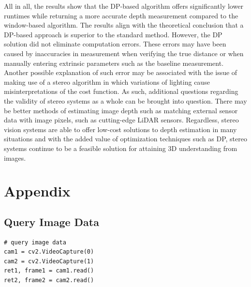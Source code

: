 \documentclass[11pt]{scrartcl}
\begin{document}
All in all, the results show that the DP-based algorithm offers significantly lower runtimes while returning a more accurate depth measurement compared to the window-based algorithm. The results align with the theoretical conclusion that a DP-based approach is superior to the standard method. However, the DP solution did not eliminate computation errors. These errors may have been caused by inaccuracies in measurement when verifying the true distance or when manually entering extrinsic parameters such as the baseline measurement. Another possible explanation of such error may be associated with the issue of making use of a stereo algorithm in which variations of lighting cause misinterpretations of the cost function. As such, additional questions regarding the validity of stereo systems as a whole can be brought into question. There may be better methods of estimating image depth such as matching external sensor data with image pixels, such as cutting-edge LiDAR sensors. Regardless, stereo vision systems are able to offer low-cost solutions to depth estimation in many situations and with the added value of optimization techniques such as DP, stereo systems continue to be a feasible solution for attaining 3D understanding from images.  



\section{Appendix}

\subsection{Query Image Data}
\begin{verbatim}
# query image data
cam1 = cv2.VideoCapture(0)
cam2 = cv2.VideoCapture(1)
ret1, frame1 = cam1.read()
ret2, frame2 = cam2.read()
\end{verbatim}
\end{document}
